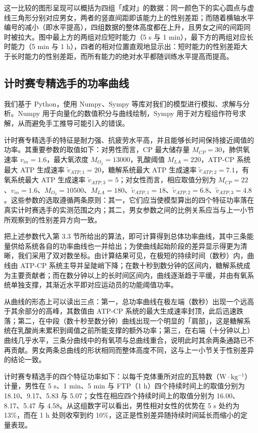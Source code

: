 \documentclass[11pt,a4paper]{ctexart}
\begin{document}
这一比较的图形呈现可以概括为四组「成对」的数据：同一颜色下的实心圆点与虚线三角形分别对应男女，两者的竖直间距即该能力上的性别差距；而随着横轴水平编号的减小（即水平提高），四组数据的整体高度都在上升，且男女之间的间距同时被拉大。图中最上方的两组对应短时能力（5 s 与 1 min），最下方的两组对应长时能力（5 min 与 1 h），四者的相对位置直观地显示出：短时能力的性别差距大于长时能力的性别差距，而所有能力的绝对水平都随训练水平提高而提高。

\subsection{计时赛专精选手的功率曲线}

我们基于 Python，使用 Numpy、Sympy 等库对我们的模型进行模拟、求解与分析。Numpy 用于向量化的数值积分与曲线绘制，Sympy 用于对方程组作符号求解，从而避免手工推导可能引入的错误。

计时赛专精选手的特征是耐力强、抗疲劳水平高，并且能够长时间保持接近阈值的功率。其重要参数的取值如下：对男性而言，CP 最大储存量 $M_{CP}=30$，肺供氧速率 $v_{in}=1.6$，最大氧浓度 $M_{O_2}=13000$，乳酸阈值 $M_{LA}=220$，ATP-CP 系统最大 ATP 生成速率 $\tilde{v}_{ATP,1}=20$，糖解系统最大 ATP 生成速率 $\tilde{v}_{ATP,2}=7.1$，有氧系统最大 ATP 生成速率 $\tilde{v}_{ATP,3}=5$；对女性而言，相应取值分别为 $M_{CP}=22$、$v_{in}=1.6$、$M_{O_2}=10500$、$M_{LA}=180$、$\tilde{v}_{ATP,1}=18$、$\tilde{v}_{ATP,2}=6.8$、$\tilde{v}_{ATP,3}=4.8$。这些参数的选取遵循两条原则：其一，它们应当使模型算出的四个特征功率落在真实计时赛选手的实测范围之内；其二，男女参数之间的比例关系应当与上一小节所观察到的性别差异方向一致。

把上述参数代入第 3.3 节所给出的算法，即可计算得到总体功率曲线，其中三条能量供给系统各自的功率曲线也一并给出；为使曲线起始阶段的差异显示得更为清晰，我们采用了双对数坐标。由计算结果可见，在极短的持续时间（数秒）内，曲线由 ATP-CP 系统主导并呈陡峭下降；在数十秒到数分钟的区间内，糖解系统成为主要贡献者；而在数分钟以上的长时间区间内，曲线逐渐趋于平缓，并由有氧系统单独支撑，其渐近水平即对应运动员的功能阈值功率。

从曲线的形态上可以读出三点：第一，总功率曲线在极左端（数秒）出现一个远高于其余部分的高峰，其数值由 ATP-CP 系统的最大生成速率封顶，此后迅速跌落；第二，在中段（数十秒至数分钟）曲线出现一个明显的「肩部」，这是糖解系统在乳酸尚未累积到阈值之前所能支撑的额外功率；第三，在右端（十分钟以上）曲线几乎水平，三条分曲线中的有氧项与总曲线重合，说明此时其余两条通路已不再贡献。男女两条总曲线的形状相同而整体高度不同，这与上一小节关于性别差异的结论一致。

计时赛专精选手的四个特征功率如下：以每千克体重所对应的瓦特数（$\mathrm{W\cdot kg^{-1}}$）计量，男性在 5 s、1 min、5 min 与 FTP（1 h）四个持续时间上的取值分别为 18.10、9.17、5.83 与 5.07；女性在相应四个持续时间上的取值分别为 16.00、8.17、5.47 与 4.58。从这组数字可以看出，男性相对女性的优势在 5 s 处约为 13\%，而在 1 h 处则收窄到约 10\%，这正是性别差异随持续时间延长而缩小的定量表现。
\end{document}

